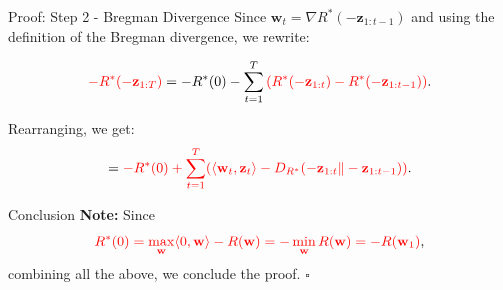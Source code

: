 \documentclass[handout]{beamer}
\begin{document}
\begin{frame}{Proof: Step 2 - Bregman Divergence}
Since \( \mathbf{w}_t = \nabla R^*(-\mathbf{z}_{1:t-1}) \) and using the definition of the Bregman divergence, we rewrite:

\[
\textcolor{mathcolor}{ -R^*(-\mathbf{z}_{1:T}) }
= -R^*(0) - \sum_{t=1}^{T} \textcolor{mathcolor}{ (R^*(-\mathbf{z}_{1:t}) - R^*(-\mathbf{z}_{1:t-1})) }.
\]

Rearranging, we get:
\[
= \textcolor{mathcolor}{ -R^*(0) + \sum_{t=1}^{T} (\langle \mathbf{w}_t, \mathbf{z}_t \rangle - D_{R^*}(-\mathbf{z}_{1:t} \| -\mathbf{z}_{1:t-1})) }.
\]
\end{frame}

\begin{frame}{Conclusion}
\textbf{Note:} Since
\[
\textcolor{mathcolor}{ R^*(0) = \max_{\mathbf{w}} \langle 0, \mathbf{w} \rangle - R(\mathbf{w}) = - \min_{\mathbf{w}} R(\mathbf{w}) = -R(\mathbf{w}_1) },
\]
combining all the above, we conclude the proof. \(\square\)
\end{frame}
\end{document}
